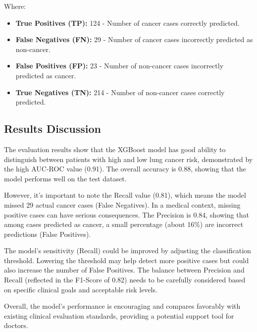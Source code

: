 Where:
\begin{itemize}
    \item \textbf{True Positives (TP):} 124 - Number of cancer cases correctly predicted.
    \item \textbf{False Negatives (FN):} 29 - Number of cancer cases incorrectly predicted as non-cancer.
    \item \textbf{False Positives (FP):} 23 - Number of non-cancer cases incorrectly predicted as cancer.
    \item \textbf{True Negatives (TN):} 214 - Number of non-cancer cases correctly predicted.
\end{itemize}

\subsection{Results Discussion}

The evaluation results show that the XGBoost model has good ability to distinguish between patients with high and low lung cancer risk, demonstrated by the high AUC-ROC value (0.91). The overall accuracy is 0.88, showing that the model performs well on the test dataset.

However, it's important to note the Recall value (0.81), which means the model missed 29 actual cancer cases (False Negatives). In a medical context, missing positive cases can have serious consequences. The Precision is 0.84, showing that among cases predicted as cancer, a small percentage (about 16\%) are incorrect predictions (False Positives).

The model's sensitivity (Recall) could be improved by adjusting the classification threshold. Lowering the threshold may help detect more positive cases but could also increase the number of False Positives. The balance between Precision and Recall (reflected in the F1-Score of 0.82) needs to be carefully considered based on specific clinical goals and acceptable risk levels.

Overall, the model's performance is encouraging and compares favorably with existing clinical evaluation standards, providing a potential support tool for doctors.
